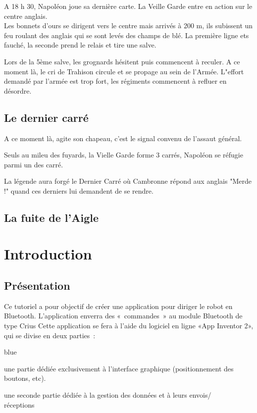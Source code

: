 A 18 h 30, Napoléon joue sa dernière carte. La Veille Garde entre en action sur le centre anglais.\\
Les bonnets d'ours se dirigent vers le centre mais arrivés à 200 m, ils subissent un feu roulant des anglais qui se sont levés des champs de blé. La première ligne ets fauché, la seconde prend le relais et tire une salve.


Lors de la 5ème salve, les grognards hésitent puis commencent à reculer. A ce moment là, le cri de Trahison circule et se propage au sein de l'Armée. L"effort demandé par l'armée est trop fort, les régiments commencent à refluer en désordre.


\section{Le dernier carré}

A ce moment là, \wel agite son chapeau, c'est le signal convenu de l'assaut général.

Seuls au mileu des fuyards, la Vielle Garde forme 3 carrés, Napoléon se réfugie parmi un des carré.

La légende aura forgé le Dernier Carré où Cambronne répond aux anglais "Merde !" quand ces derniers lui demandent de se rendre.\\
\section{La fuite de l'Aigle}%

\chapter{Introduction}     

\section{Présentation}

Ce tutoriel a pour objectif de créer une application pour diriger le robot en Bluetooth. 
L'application enverra des « commandes » au module Bluetooth de type Crius 
Cette application se fera à l'aide du logiciel en ligne «App Inventor 2», qui se divise en deux parties : 

\begin{items}{blue}{\Triangle}
    \item une partie dédiée exclusivement à l'interface graphique
	  (positionnement des boutons, etc).
	\item une seconde partie dédiée à la gestion des données et à leurs envois/\\réceptions
\end{items}


